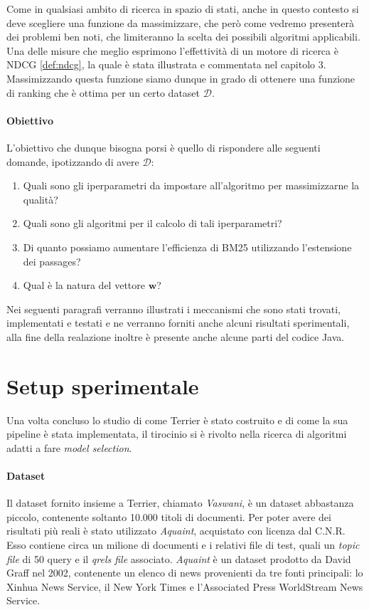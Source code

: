 Come in qualsiasi ambito di ricerca in spazio di stati, anche in questo contesto
si deve scegliere una funzione da massimizzare, che però come vedremo presenterà dei problemi ben
noti, che limiteranno la scelta dei possibili algoritmi applicabili.
Una delle misure che meglio esprimono l'effettività di un motore di ricerca è NDCG \ref{def:ndcg}, la quale è
stata illustrata e commentata nel capitolo 3.
Massimizzando questa funzione siamo dunque in grado di ottenere una funzione di ranking che
è ottima per un certo dataset $\mathcal{D}$.

\paragraph{Obiettivo}
L'obiettivo che dunque bisogna porsi è quello di rispondere alle seguenti domande, ipotizzando
di avere $\mathcal{D}$:

\begin{enumerate}
	\item Quali sono gli iperparametri da impostare all'algoritmo per massimizzarne la qualità?
	\item Quali sono gli algoritmi per il calcolo di tali iperparametri?
	\item Di quanto possiamo aumentare l'efficienza di BM25 utilizzando l'estensione dei passages?
	\item Qual è la natura del vettore $\boldsymbol{w}$?
\end{enumerate}

Nei seguenti paragrafi verranno illustrati i meccanismi che sono stati
trovati, implementati e testati e ne verranno forniti anche alcuni risultati
sperimentali, alla fine della realazione inoltre è presente anche alcune
parti del codice Java.

\section{Setup sperimentale}

Una volta concluso lo studio di come Terrier è stato costruito e di come la sua pipeline è stata implementata,
il tirocinio si è rivolto nella ricerca di algoritmi adatti a fare \textit{model selection}.

\paragraph{Dataset}
Il dataset fornito insieme a Terrier, chiamato \textit{Vaswani}, è un dataset abbastanza piccolo,
contenente soltanto 10.000 titoli di documenti. Per poter avere dei risultati più
reali è stato utilizzato \textit{Aquaint}, acquistato con licenza dal C.N.R.
Esso contiene circa un milione di documenti e i relativi file di test, quali
un \textit{topic file} di 50 query e il \textit{qrels file} associato.
\textit{Aquaint} è un dataset prodotto da David Graff nel 2002,
contenente un elenco di news provenienti da tre fonti principali:
lo Xinhua News Service, il New York Times e l'Associated Press WorldStream News Service.



